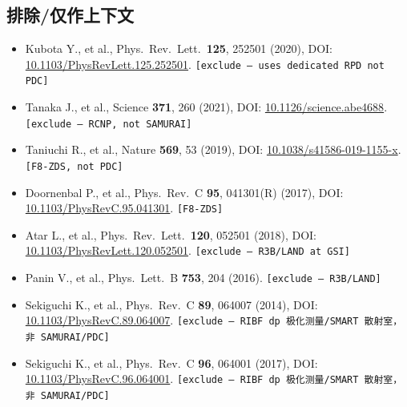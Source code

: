 \documentclass[a4paper, 11pt]{article}
\begin{document}
\subsection{排除/仅作上下文}
\begin{itemize}
  \item Kubota Y., et al., Phys.\ Rev.\ Lett.\ \textbf{125}, 252501 (2020), DOI: \href{https://doi.org/10.1103/PhysRevLett.125.252501}{10.1103/PhysRevLett.125.252501}. \texttt{[exclude --- uses dedicated RPD not PDC]}
  \item Tanaka J., et al., Science \textbf{371}, 260 (2021), DOI: \href{https://doi.org/10.1126/science.abe4688}{10.1126/science.abe4688}. \texttt{[exclude --- RCNP, not SAMURAI]}
  \item Taniuchi R., et al., Nature \textbf{569}, 53 (2019), DOI: \href{https://doi.org/10.1038/s41586-019-1155-x}{10.1038/s41586-019-1155-x}. \texttt{[F8-ZDS, not PDC]}
  \item Doornenbal P., et al., Phys.\ Rev.\ C \textbf{95}, 041301(R) (2017), DOI: \href{https://doi.org/10.1103/PhysRevC.95.041301}{10.1103/PhysRevC.95.041301}. \texttt{[F8-ZDS]}
  \item Atar L., et al., Phys.\ Rev.\ Lett.\ \textbf{120}, 052501 (2018), DOI: \href{https://doi.org/10.1103/PhysRevLett.120.052501}{10.1103/PhysRevLett.120.052501}. \texttt{[exclude --- R3B/LAND at GSI]}
  \item Panin V., et al., Phys.\ Lett.\ B \textbf{753}, 204 (2016). \texttt{[exclude --- R3B/LAND]}
  \item Sekiguchi K., et al., Phys.\ Rev.\ C \textbf{89}, 064007 (2014), DOI: \href{https://doi.org/10.1103/PhysRevC.89.064007}{10.1103/PhysRevC.89.064007}. \texttt{[exclude --- RIBF dp 极化测量/SMART 散射室，非 SAMURAI/PDC]}
  \item Sekiguchi K., et al., Phys.\ Rev.\ C \textbf{96}, 064001 (2017), DOI: \href{https://doi.org/10.1103/PhysRevC.96.064001}{10.1103/PhysRevC.96.064001}. \texttt{[exclude --- RIBF dp 极化测量/SMART 散射室，非 SAMURAI/PDC]}
\end{itemize}
\end{document}
